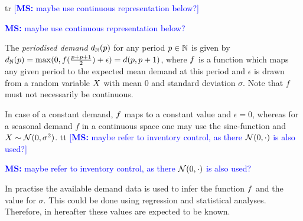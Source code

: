 \documentclass[mnsc]{informs3}
\newcommand\MS[2][r]{\ifx t#1 \textcolor{blue}{[\textbf{MS:} #2]}
  \else \begin{center}\textcolor{blue}{\textbf{MS:} #2} \end{center} \fi}
\begin{document}
\MS{maybe use continuous representation below?}

\begin{definition}
  The \emph{periodised demand} ${d_{\mathbb{N}}}(p)$ for any period $p \in \mathbb{N}$ is given by
  ${d_{\mathbb{N}}}(p) = \max(0,{f}(\frac{p+p+1}{2}) + \epsilon) = {d}(p,p+1)$, where ${f}$ is a
  function which maps any given period to the expected mean demand at this period and $\epsilon$ is
  drawn from a random variable $X$ with mean $0$ and standard deviation $\sigma$. Note that $f$
  must not necessarily be continuous.
\end{definition}


\begin{example}
  In case of a constant demand, ${f}$ maps to a constant value and $\epsilon = 0$, whereas for a
  seasonal demand $f$ in a continuous space one may use the sine-function and
  $X \sim \mathcal{N}(0,\sigma^{2})$.
  \MS[t]{maybe refer to inventory control, as there $\mathcal{N}(0,\cdot)$ is also used?}

\end{example}

In practise the available demand data is used to infer the function ${f}$ and the value for
$\sigma$. This could be done using regression and statistical analyses. Therefore, in hereafter
these values are expected to be known.

\end{document}
